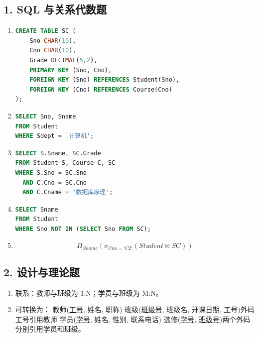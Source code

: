 \documentclass{../../note}
\begin{document}
\subsection*{1. SQL 与关系代数题}

\begin{enumerate}[label=(\arabic*), itemsep=0.8em]
\item
\begin{lstlisting}[language=SQL]
CREATE TABLE SC (
    Sno CHAR(10),
    Cno CHAR(10),
    Grade DECIMAL(5,2),
    PRIMARY KEY (Sno, Cno),
    FOREIGN KEY (Sno) REFERENCES Student(Sno),
    FOREIGN KEY (Cno) REFERENCES Course(Cno)
);
\end{lstlisting}

\item
\begin{lstlisting}[language=SQL]
SELECT Sno, Sname
FROM Student
WHERE Sdept = '计算机';
\end{lstlisting}

\item
\begin{lstlisting}[language=SQL]
SELECT S.Sname, SC.Grade
FROM Student S, Course C, SC
WHERE S.Sno = SC.Sno
  AND C.Cno = SC.Cno
  AND C.Cname = '数据库原理';
\end{lstlisting}

\item
\begin{lstlisting}[language=SQL]
SELECT Sname
FROM Student
WHERE Sno NOT IN (SELECT Sno FROM SC);
\end{lstlisting}

\item
\[
\Pi_{Sname}(\sigma_{Cno='C2'}(Student \bowtie SC))
\]
\end{enumerate}

\subsection*{2. 设计与理论题}

\begin{enumerate}[label=(\arabic*), itemsep=0.8em]
\item 联系：教师与班级为 1:N；学员与班级为 M:N。
\item 可转换为：\newline
教师(\underline{工号}, 姓名, 职称)\newline
班级(\underline{班级号}, 班级名, 开课日期, 工号)\quad 外码工号引用教师\newline
学员(\underline{学号}, 姓名, 性别, 联系电话)\newline
选修(\underline{学号}, \underline{班级号})\quad 两个外码分别引用学员和班级。
\end{enumerate}
\end{document}
